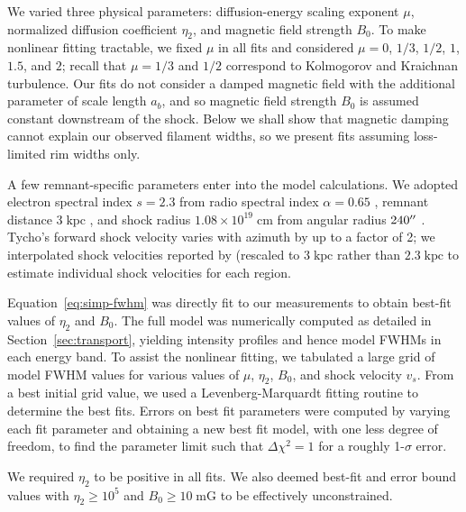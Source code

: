 \documentclass[iop, apj, numberedappendix, twocolappendix]{emulateapj}
\newcommand*{\mt}{\mathrm}
\newcommand*{\unit}[1]{\;\mt{#1}}  %
\begin{document}
We varied three physical parameters: diffusion-energy scaling exponent $\mu$,
normalized diffusion coefficient $\eta_2$, and magnetic field strength $B_0$.
To make nonlinear fitting tractable, we fixed $\mu$ in all fits and considered
$\mu = 0$, $1/3$, $1/2$, $1$, $1.5$, and $2$; recall that $\mu = 1/3$ and $1/2$
correspond to Kolmogorov and Kraichnan turbulence.  Our fits do not consider
a damped magnetic field with the additional parameter of scale length $a_b$,
and so magnetic field strength $B_0$ is assumed constant downstream of the
shock.  Below we shall show that magnetic damping cannot explain our observed
filament widths, so we present fits assuming loss-limited rim widths only.

A few remnant-specific parameters enter into the model calculations.  We
adopted electron spectral index $s = 2.3$ from radio spectral index $\alpha =
0.65$ \citep{kothes2006},
remnant distance $3 \unit{kpc}$ \citep[cf.][]{hayato2010}, and shock radius
$1.08 \times 10^{19} \unit{cm}$ from angular radius $240\mbox{$^{\prime\prime}$}$
\citep{green2009}.  Tycho's forward shock velocity varies with azimuth by up to
a factor of 2; we interpolated shock velocities reported by
\citet{williams2013} (rescaled to $3 \unit{kpc}$ rather than $2.3 \unit{kpc}$
to estimate individual shock velocities for each region.

Equation~\eqref{eq:simp-fwhm} was directly fit to our measurements to obtain
best-fit values of $\eta_2$ and $B_0$.  The full model was numerically computed
as detailed in Section~\ref{sec:transport}, yielding intensity profiles and
hence model FWHMs in each energy band.  To assist the nonlinear
fitting, we tabulated a large grid of model FWHM values for various values of
$\mu$, $\eta_2$, $B_0$, and shock velocity $v_s$.  From a best initial grid
value, we used a Levenberg-Marquardt fitting routine to determine the best
fits.  Errors on best fit parameters were computed by varying each fit
parameter and obtaining a new best fit model, with one less degree of freedom,
to find the parameter limit such that $\Delta \chi^2 = 1$ for a roughly
1-$\sigma$ error.

We required $\eta_2$ to be positive in all fits.  We also deemed
best-fit and error bound values with $\eta_2 \geq 10^5$ and $B_0 \geq 10
\unit{mG}$ to be effectively unconstrained. %
\end{document}
